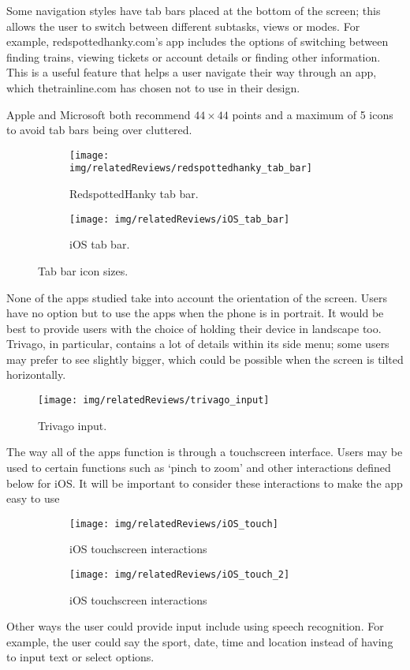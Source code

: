 Some navigation styles have tab bars placed at the bottom of the screen; this
allows the user to switch between different subtasks, views or modes. For
example, redspottedhanky.com's app includes the options of switching between
finding trains, viewing tickets or account details or finding other
information. This is a useful feature that helps a user navigate their way
through an app, which thetrainline.com has chosen not to use in their design.

Apple and Microsoft both recommend $44\times44$ points and a maximum of 5 icons
to avoid tab bars being over cluttered.
\begin{figure}[ht]
	\centering
	\begin{subfigure}[b]{0.35\textwidth}
		\texttt{[image: img/relatedReviews/redspottedhanky\_tab\_bar]}
		\caption{RedspottedHanky tab bar. }\label{fig:redspottedhanky_tab_bar}
	\end{subfigure}%
	\qquad
	\begin{subfigure}[b]{0.4\textwidth}
		\texttt{[image: img/relatedReviews/iOS\_tab\_bar]}
		\caption{iOS tab bar.}\label{fig:iOS_tab_bar}
	\end{subfigure}
	\caption{Tab bar icon sizes.}
\end{figure}

None of the apps studied take into account the orientation of the screen. Users
have no option but to use the apps when the phone is in portrait. It would be
best to provide users with the choice of holding their device in landscape too.
Trivago, in particular, contains a lot of details within its side menu; some
users may prefer to see slightly bigger, which could be possible when the
screen is tilted horizontally.
\begin{figure}[ht]
	\begin{center}
		\texttt{[image: img/relatedReviews/trivago\_input]}
	\end{center}
	\caption{Trivago input\cite{TrivagoIOS}. }\label{fig:trivago_input}
\end{figure}

The way all of the apps function is through a touchscreen interface. Users may
be used to certain functions such as `pinch to zoom' and other interactions
defined below for iOS\@. It will be important to consider these interactions to
make the app easy to use
\begin{figure}[ht]
	\centering
	\begin{subfigure}[b]{0.4\textwidth}
		\texttt{[image: img/relatedReviews/iOS\_touch]}
		\caption{iOS touchscreen interactions}\label{fig:iOS_touch}
	\end{subfigure}%
	\qquad
	\begin{subfigure}[b]{0.4\textwidth}
		\texttt{[image: img/relatedReviews/iOS\_touch\_2]}
		\caption{iOS touchscreen interactions}
	\end{subfigure}
	\caption{}\label{fig:iOS_touch2}
\end{figure}

Other ways the user could provide input include using speech recognition. For
example, the user could say the sport, date, time and location instead of
having to input text or select options.

